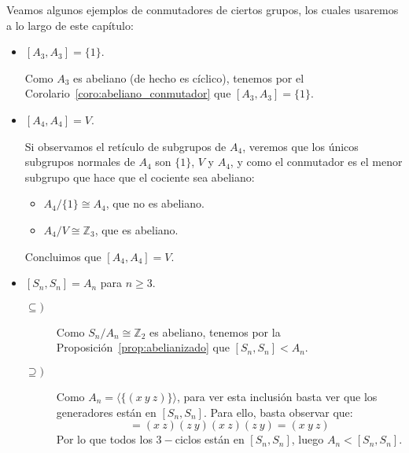 \begin{ejemplo}
    Veamos algunos ejemplos de conmutadores de ciertos grupos, los cuales usaremos a lo largo de este capítulo:
    \begin{itemize}
        \item $[A_3,A_3] = \{1\}$.

            Como $A_3$ es abeliano (de hecho es cíclico), tenemos por el Corolario~\ref{coro:abeliano_conmutador} que $[A_3, A_3] = \{1\}$.
        \item $[A_4, A_4] = V$.

            Si observamos el retículo de subgrupos de $A_4$, veremos que los únicos subgrupos normales de $A_4$ son $\{1\}$, $V$ y $A_4$, y como el conmutador es el menor subgrupo que hace que el cociente sea abeliano:
            \begin{itemize}
                \item $A_4/\{1\} \cong A_4$, que no es abeliano.
                \item $A_4/V \cong \mathbb{Z}_3$, que es abeliano.
            \end{itemize}
            Concluimos que $[A_4, A_4] = V$.
        \item $[S_n,S_n] = A_n$ para $n\geq 3$.

            \begin{description}
                \item [$\subseteq)$] Como $S_n/A_n \cong \mathbb{Z}_2$ es abeliano, tenemos por la Proposición~\ref{prop:abelianizado} que $[S_n,S_n]<A_n$.
                \item [$\supseteq)$] Como $A_n = \langle \{(x\ y\ z)\} \rangle $, para ver esta inclusión basta ver que los generadores están en $[S_n, S_n]$. Para ello, basta observar que:
                    \begin{equation*}
                        [(x\ z), (z\ y)] = (x\ z)(z\ y)(x\ z)(z\ y) = (x\ y\ z)
                    \end{equation*}
                    Por lo que todos los $3-$ciclos están en $[S_n,S_n]$, luego $A_n < [S_n,S_n]$.
            \end{description}
    \end{itemize}
\end{ejemplo}

